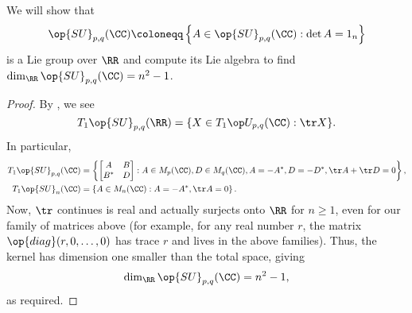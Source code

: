 \documentclass[../notes.tex]{subfiles}
\begin{document}
\begin{example}
	We will show that
	\[\op{SU}_{p,q}(\CC)\coloneqq\left\{A\in\op{SU}_{p,q}(\CC):\det A=1_n\right\}\]
	is a Lie group over $\RR$ and compute its Lie algebra to find $\dim_\RR\op{SU}_{p,q}(\CC)=n^2-1$.
\end{example}
\begin{proof}
	By , we see
	\[T_1\op{SU}_{p,q}(\RR)=\{X\in T_1\op U_{p,q}(\CC):\tr X\}.\]
	In particular,
	\begin{align*}
		T_1\op{SU}_{p,q}(\CC) &= \left\{\begin{bmatrix}
			A & B \\ B^* & D
		\end{bmatrix}:A\in M_p(\CC),D\in M_q(\CC),A=-A^*,D=-D^*,\tr A+\tr D=0\right\}, \\
		T_1\op{SU}_n(\CC) &= \left\{A\in M_n(\CC):A=-A^*,\tr A=0\right\}.
	\end{align*}
	Now, $\tr$ continues is real and actually surjects onto $\RR$ for $n\ge1$, even for our family of matrices above (for example, for any real number $r$, the matrix $\op{diag}(r,0,\ldots,0)$ has trace $r$ and lives in the above families). Thus, the kernel has dimension one smaller than the total space, giving
	\[\dim_\RR\op{SU}_{p,q}(\CC) = n^2-1,\]
	as required.
\end{proof}
\end{document}
